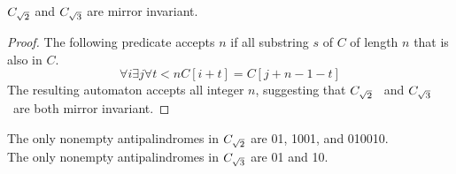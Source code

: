 
\begin{theorem}
$C_{\sqrt{2}}$ and $C_{\sqrt{3}}$ are mirror invariant. 
\end{theorem}
\begin{proof}
The following predicate accepts $n$ if all substring $s$ of $C$ of length $n$ that is also in $C$. \[\forall i \exists j \forall t<n C[i+t] = C[j+n-1-t]\]
The resulting automaton accepts all integer $n$, suggesting that $C_{\sqrt{2}}$~ and $C_{\sqrt{3}}$ ~are both mirror invariant. 
\end{proof}

\begin{theorem}
The only nonempty antipalindromes in $C_{\sqrt{2}}$ are 01, 1001, and 010010.\\
The only nonempty antipalindromes in $C_{\sqrt{3}}$ are 01 and 10.
\end{theorem}
